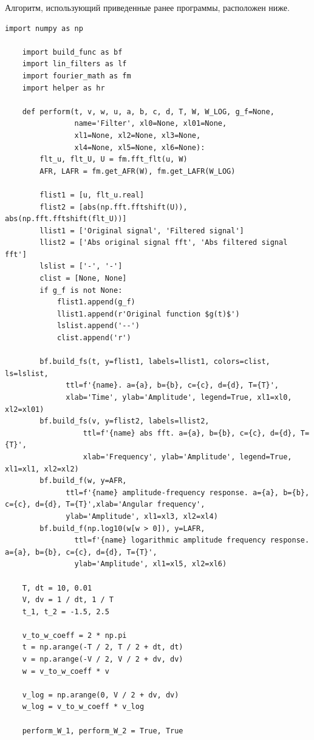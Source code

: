 \documentclass[a4paper, 12pt]{article}
\begin{document}
    Алгоритм, использующий приведенные ранее программы, расположен ниже.
    \begin{lstlisting}[label=l2, caption={Алгоритм, использующий приведенные ранее программы.}]
    import numpy as np

    import build_func as bf
    import lin_filters as lf
    import fourier_math as fm
    import helper as hr

    def perform(t, v, w, u, a, b, c, d, T, W, W_LOG, g_f=None,
                name='Filter', xl0=None, xl01=None,
                xl1=None, xl2=None, xl3=None,
                xl4=None, xl5=None, xl6=None):
        flt_u, flt_U, U = fm.fft_flt(u, W)
        AFR, LAFR = fm.get_AFR(W), fm.get_LAFR(W_LOG)

        flist1 = [u, flt_u.real]
        flist2 = [abs(np.fft.fftshift(U)), abs(np.fft.fftshift(flt_U))]
        llist1 = ['Original signal', 'Filtered signal']
        llist2 = ['Abs original signal fft', 'Abs filtered signal fft']
        lslist = ['-', '-']
        clist = [None, None]
        if g_f is not None:
            flist1.append(g_f)
            llist1.append(r'Original function $g(t)$')
            lslist.append('--')
            clist.append('r')

        bf.build_fs(t, y=flist1, labels=llist1, colors=clist, ls=lslist,
              ttl=f'{name}. a={a}, b={b}, c={c}, d={d}, T={T}', 
              xlab='Time', ylab='Amplitude', legend=True, xl1=xl0, xl2=xl01)
        bf.build_fs(v, y=flist2, labels=llist2, 
                  ttl=f'{name} abs fft. a={a}, b={b}, c={c}, d={d}, T={T}', 
                  xlab='Frequency', ylab='Amplitude', legend=True, xl1=xl1, xl2=xl2)
        bf.build_f(w, y=AFR,
              ttl=f'{name} amplitude-frequency response. a={a}, b={b}, c={c}, d={d}, T={T}',xlab='Angular frequency', 
              ylab='Amplitude', xl1=xl3, xl2=xl4)
        bf.build_f(np.log10(w[w > 0]), y=LAFR,
                ttl=f'{name} logarithmic amplitude frequency response. a={a}, b={b}, c={c}, d={d}, T={T}',
                ylab='Amplitude', xl1=xl5, xl2=xl6)

    T, dt = 10, 0.01
    V, dv = 1 / dt, 1 / T
    t_1, t_2 = -1.5, 2.5

    v_to_w_coeff = 2 * np.pi
    t = np.arange(-T / 2, T / 2 + dt, dt)
    v = np.arange(-V / 2, V / 2 + dv, dv)
    w = v_to_w_coeff * v

    v_log = np.arange(0, V / 2 + dv, dv)
    w_log = v_to_w_coeff * v_log

    perform_W_1, perform_W_2 = True, True


\end{lstlisting}
\end{document}
